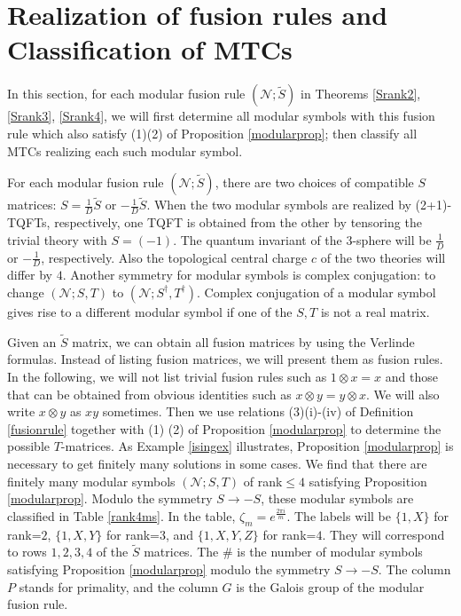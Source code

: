 \documentclass[12pt,psamsfonts]{amsart}
\newcommand{\mN}{\mathcal{N}}
\newcommand{\tS}{\tilde{S}}
\numberwithin{equation}{section}
\theoremstyle{definition}
\begin{document}
\vspace{.5cm}

\section{Realization of fusion rules and Classification of MTCs}\label{realization}

In this section, for each modular fusion rule $(\mN;\tS)$ in
Theorems \ref{Srank2}, \ref{Srank3}, \ref{Srank4}, we will first
determine all modular symbols with this fusion rule which also
satisfy (1)(2) of Proposition \ref{modularprop}; then classify all
MTCs realizing each such modular symbol.

For each modular fusion rule $(\mN;\tS)$, there are two choices of
compatible $S$ matrices: $S=\frac{1}{D} \tS$ or $-\frac{1}{D}\tS$.
When the two modular symbols are realized by (2+1)-TQFTs,
respectively, one TQFT is obtained from the other by tensoring the
trivial theory with $S=(-1)$.  The quantum invariant of the
3-sphere will be $\frac{1}{D}$ or $-\frac{1}{D}$, respectively.
Also the topological central charge $c$ of the two theories will
differ by $4$.  Another symmetry for modular symbols is complex
conjugation: to change $(\mN;S,T)$ to
$(\mN;S^{\dagger},T^{\dagger})$.  Complex conjugation of a modular
symbol gives rise to a different modular symbol if one of the
$S,T$ is not a real matrix.

Given an $\tS$ matrix, we can obtain all fusion matrices by using
the Verlinde formulas.  Instead of listing fusion matrices, we
will present them as fusion rules.  In the following, we will not
list trivial fusion rules such as $1\otimes x=x$ and those that
can be obtained from obvious identities such as $x\otimes
y=y\otimes x$. We will also write $x\otimes y$ as $xy$ sometimes.
Then we use relations (3)(i)-(iv) of Definition \ref{fusionrule}
together with (1) (2) of Proposition \ref{modularprop} to
determine the possible $T$-matrices.  As Example \ref{isingex}
illustrates, Proposition \ref{modularprop} is necessary to get
finitely many solutions in some cases.  We find that there are
finitely many modular symbols $(\mN;S,T)$ of rank$\leq4$
satisfying Proposition \ref{modularprop}. Modulo the symmetry
$S\rightarrow -S$, these modular symbols are classified in Table
\ref{rank4ms}.  In the table, $\zeta_m=e^{\frac{2\pi i}{m}}$.  The labels will be $\{1,X \}$ for rank=$2$,
$\{1,X,Y \}$ for rank=$3$, and $\{1,X,Y,Z\}$ for rank=$4$.  They
will correspond to rows $1,2,3,4$ of the $\tS$ matrices.  The $\#$
is the number of modular symbols satisfying Proposition
\ref{modularprop} modulo the symmetry $S\rightarrow -S$.  The
column $P$ stands for primality, and the column $G$ is the Galois
group of the modular fusion rule.
\end{document}

